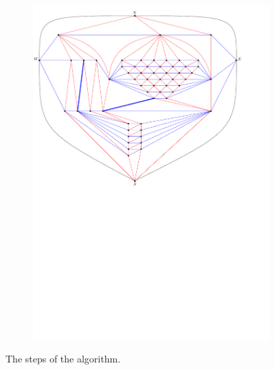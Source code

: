 \begin{figure}
\begin{subfigure}[b]{.9 \textwidth}
      \includegraphics[width=\textwidth]{examples/img/vertWorstCase/subdiv1}
      \caption{}
      \label{fig:ex:vert:subdiv1}
    \end{subfigure}
  \caption{The steps of the algorithm.}
  \label{}
\end{figure}



